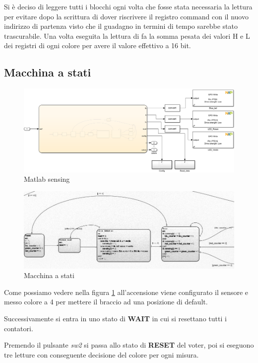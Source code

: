 \documentclass[12pt]{report}
\begin{document}
Si è deciso di leggere tutti i blocchi ogni volta che fosse stata necessaria la lettura per evitare dopo la scrittura di dover riscrivere il registro command con il nuovo indirizzo di partenza visto che
 il guadagno in termini di tempo sarebbe stato trascurabile. Una volta eseguita la lettura di fa la somma pesata dei valori H e L dei registri di ogni colore per avere il valore effettivo a 16 bit.

\subsection{Macchina a stati}

\begin{figure}[h] 
    \centering
    \includegraphics[width=0.7\linewidth]{images/Immagini sensore/Sensing e macchina a stati.png}
    \caption{Matlab sensing}
    \end{figure}

\begin{figure}[h]
    \includegraphics[width=0.8\linewidth]{images/Immagini sensore/sensor_chart.png}
    \caption{Macchina a stati}
    \label{fig:stateflow}
\end{figure}

Come possiamo vedere nella figura \ref{fig:stateflow} all'accensione viene configurato il sensore e messo colore a 4 per mettere il braccio ad una posizione di default.

Successivamente si entra in uno stato di \textbf{WAIT} in cui si resettano tutti i contatori. 

Premendo il pulsante \emph{sw2} si passa allo stato di \textbf{RESET} del voter, poi si eseguono tre letture con conseguente decisione del colore per ogni misura. 
\end{document}
